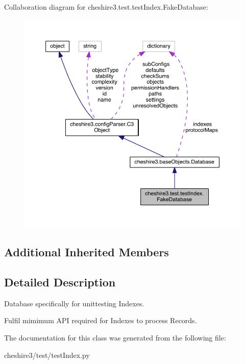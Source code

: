 Collaboration diagram for cheshire3.\-test.\-test\-Index.\-Fake\-Database\-:
\nopagebreak
\begin{figure}[H]
\begin{center}
\leavevmode
\includegraphics[width=350pt]{classcheshire3_1_1test_1_1test_index_1_1_fake_database__coll__graph}
\end{center}
\end{figure}
\subsection*{Additional Inherited Members}


\subsection{Detailed Description}
\begin{DoxyVerb}Database specifically for unittesting Indexes.

Fulfil mimimum API required for Indexes to process Records.
\end{DoxyVerb}
 

The documentation for this class was generated from the following file\-:\begin{DoxyCompactItemize}
\item 
cheshire3/test/test\-Index.\-py\end{DoxyCompactItemize}
